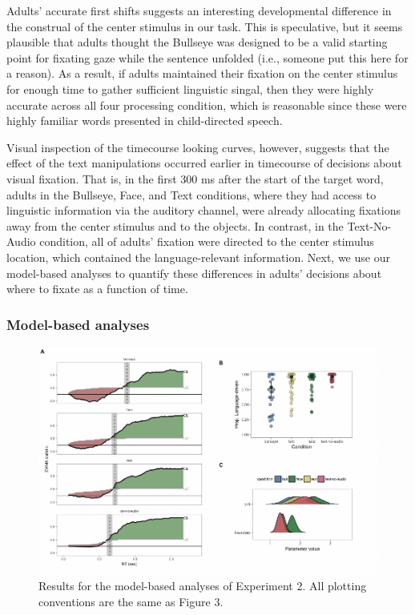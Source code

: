 \documentclass[english,floatsintext,man]{apa6}
\theoremstyle{definition}
\theoremstyle{definition}
\theoremstyle{definition}
\theoremstyle{remark}
\begin{document}
Adults' accurate first shifts suggests an interesting developmental
difference in the construal of the center stimulus in our task. This is
speculative, but it seems plausible that adults thought the Bullseye was
designed to be a valid starting point for fixating gaze while the
sentence unfolded (i.e., someone put this here for a reason). As a
result, if adults maintained their fixation on the center stimulus for
enough time to gather sufficient linguistic singal, then they were
highly accurate across all four processing condition, which is
reasonable since these were highly familiar words presented in
child-directed speech.

Visual inspection of the timecourse looking curves, however, suggests
that the effect of the text manipulations occurred earlier in timecourse
of decisions about visual fixation. That is, in the first 300 ms after
the start of the target word, adults in the Bullseye, Face, and Text
conditions, where they had access to linguistic information via the
auditory channel, were already allocating fixations away from the center
stimulus and to the objects. In contrast, in the Text-No-Audio
condition, all of adults' fixation were directed to the center stimulus
location, which contained the language-relevant information. Next, we
use our model-based analyses to quantify these differences in adults'
decisions about where to fixate as a function of time.

\hypertarget{model-based-analyses-1}{%
\subsubsection{Model-based analyses}\label{model-based-analyses-1}}

\begin{figure}[H]

{\centering \includegraphics[width=0.9\linewidth]{figs/text-model-plots-1} 

}

\caption{Results for the model-based analyses of Experiment 2. All plotting conventions are the same as Figure 3.}\label{fig:text-model-plots}
\end{figure}
\end{document}
